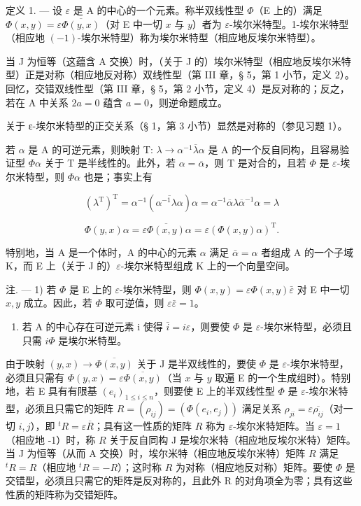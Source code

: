 定义 1. --- 设 \(\varepsilon\) 是 A 的中心的一个元素。称半双线性型 \(\Phi\)（E 上的）满足 \(\Phi(x, y) = \varepsilon \overline{\Phi(y, x)}\)（对 E 中一切 \(x\) 与 \(y\)）者为 \(\varepsilon\)-埃尔米特型。1-埃尔米特型（相应地 \((-1)\)-埃尔米特型）称为埃尔米特型（相应地反埃尔米特型）。

当 J 为恒等（这蕴含 A 交换）时，（关于 J 的）埃尔米特型（相应地反埃尔米特型）正是对称（相应地反对称）双线性型（第 III 章，§ 5，第 1 小节，定义 2）。回忆，交错双线性型（第 III 章，§ 5，第 2 小节，定义 4）是反对称的；反之，若在 A 中关系 \(2a = 0\) 蕴含 \(a = 0\)，则逆命题成立。

关于 ε-埃尔米特型的正交关系（§ 1，第 3 小节）显然是对称的（参见习题 1）。

若 \(\alpha\) 是 A 的可逆元素，则映射 T: \(\lambda \to \alpha^{-1}\overline{\lambda}\alpha\) 是 A 的一个反自同构，且容易验证型 \(\Phi\alpha\) 关于 T 是半线性的。此外，若 \(\alpha = \overline{\alpha}\)，则 T 是对合的，且若 \(\Phi\) 是 \(\varepsilon\)-埃尔米特型，则 \(\Phi\alpha\) 也是；事实上有

\[
(\lambda^ {\mathrm{T}}) ^ {\mathrm{T}} = \alpha^ {- 1} (\overline {{\alpha^ {- 1} \lambda \alpha}}) \alpha = \alpha^ {- 1} \overline {{\alpha}} \lambda \overline {{\alpha}} ^ {- 1} \alpha = \lambda
\]

\[
\Phi (y, x) \alpha = \varepsilon \overline {{\Phi (x , y)}} \alpha = \varepsilon (\Phi (x, y) \alpha) ^ {\mathrm{T}}.
\]

特别地，当 A 是一个体时，A 的中心的元素 \(\alpha\) 满足 \(\bar{\alpha} = \alpha\) 者组成 A 的一个子域 K，而 E 上（关于 J 的）\(\varepsilon\)-埃尔米特型组成 K 上的一个向量空间。

注. --- 1) 若 \(\Phi\) 是 E 上的 \(\varepsilon\)-埃尔米特型，则 \(\Phi(x, y) = \varepsilon \Phi(x, y) \bar{\varepsilon}\) 对 E 中一切 \(x, y\) 成立。因此，若 \(\Phi\) 取可逆值，则 \(\varepsilon \bar{\varepsilon} = 1\)。

\begin{enumerate}
\def\labelenumi{\arabic{enumi})}
\setcounter{enumi}{1}
\tightlist
\item
  若 A 的中心存在可逆元素 i 使得 \(\bar{i}=i\varepsilon\)，则要使 \(\Phi\) 是 \(\varepsilon\)-埃尔米特型，必须且只需 \(i\Phi\) 是埃尔米特型。
\end{enumerate}

由于映射 \((y, x) \to \overline{\Phi(x, y)}\) 关于 J 是半双线性的，要使 \(\Phi\) 是 \(\varepsilon\)-埃尔米特型，必须且只需有 \(\Phi(y, x) = \varepsilon \overline{\Phi(x, y)}\)（当 \(x\) 与 \(y\) 取遍 E 的一个生成组时）。特别地，若 E 具有有限基 \((e_i)_{1 \leqslant i \leqslant n}\)，则要使 E 上的半双线性型 \(\Phi\) 是 \(\varepsilon\)-埃尔米特型，必须且只需它的矩阵 \(R = (\rho_{ij}) = (\Phi(e_i, e_j))\) 满足关系 \(\rho_{ji} = \varepsilon \overline{\rho_{ij}}\)（对一切 \(i, j\)），即 \(^t R = \varepsilon \overline{R}\)；具有这一性质的矩阵 \(R\) 称为 \(\varepsilon\)-埃尔米特矩阵。当 \(\varepsilon = 1\)（相应地 -1）时，称 \(R\) 关于反自同构 J 是埃尔米特（相应地反埃尔米特）矩阵。当 J 为恒等（从而 A 交换）时，埃尔米特（相应地反埃尔米特）矩阵 \(R\) 满足 \(^t R = R\)（相应地 \(^t R = -R\)）；这时称 \(R\) 为对称（相应地反对称）矩阵。要使 \(\Phi\) 是交错型，必须且只需它的矩阵是反对称的，且此外 R 的对角项全为零；具有这些性质的矩阵称为交错矩阵。

